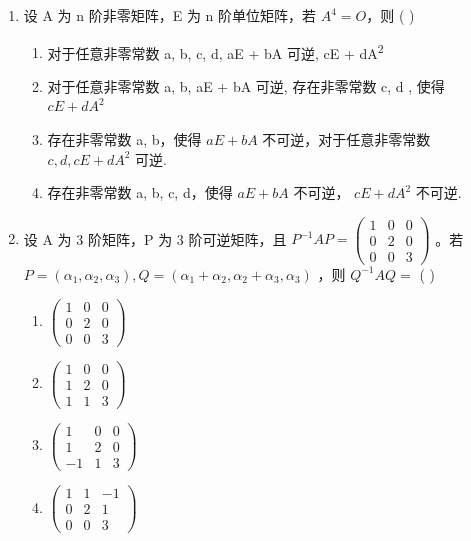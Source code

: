 \documentclass[12pt, a4paper]{ctexart}
\begin{document}
\begin{enumerate}
    \item 设 A 为 n 阶非零矩阵，E 为 n 阶单位矩阵，若 $ A^{4}=O $，则 ( \underline{\hspace{1cm}} )
    \begin{enumerate}[label=(\Alph*)]
        \item 对于任意非零常数 a, b, c, d, aE + bA 可逆, cE + dA\textsuperscript{2}
        \item 对于任意非零常数 a, b, aE + bA 可逆, 存在非零常数 c, d , 使得 $ cE + dA^{2} $
        \item 存在非零常数 a, b，使得 $ aE + bA $ 不可逆，对于任意非零常数 $ c, d, cE + dA^{2} $ 可逆.
        \item 存在非零常数 a, b, c, d，使得 $ aE + bA $ 不可逆， $ cE + dA^{2} $ 不可逆.
    \end{enumerate}

    \item 设 A 为 3 阶矩阵，P 为 3 阶可逆矩阵，且 $ P^{-1}AP=\begin{pmatrix}1&0&0\\0&2&0\\0&0&3\end{pmatrix} $ 。若 $ P=\left(\alpha_{1},\alpha_{2},\alpha_{3}\right),Q=\left(\alpha_{1}+\alpha_{2},\alpha_{2}+\alpha_{3},\alpha_{3}\right) $ ，则 $ Q^{-1}AQ= $ ( \underline{\hspace{1cm}} )
    \begin{enumerate}[label=(\Alph*)]
        \item $ \begin{pmatrix}1&0&0\\0&2&0\\0&0&3\end{pmatrix} $
        \item $ \begin{pmatrix}1&0&0\\1&2&0\\1&1&3\end{pmatrix} $
        \item $ \begin{pmatrix}1&0&0\\1&2&0\\-1&1&3\end{pmatrix} $
        \item $ \begin{pmatrix}1&1&-1\\0&2&1\\0&0&3\end{pmatrix} $
    \end{enumerate}


\end{enumerate}
\end{document}
